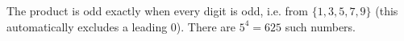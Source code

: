 The product is odd exactly when every digit is odd, i.e. from $\{1,3,5,7,9\}$ (this automatically excludes a leading $0$). There are $5^4=\boxed{625}$ such numbers.
